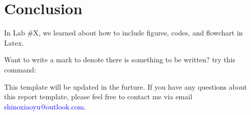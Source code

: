 \section{Conclusion}

In Lab \#X, we learned about how to include figures, codes, and flowchart in Latex.

Want to write a mark to denote there is something to be written? try this command: \TBW


This template will be updated in the furture. If you have any questions about this report template, please feel free to contact me via email {\textcolor{blue}{shinoxiaoyu@outlook.com}}.
